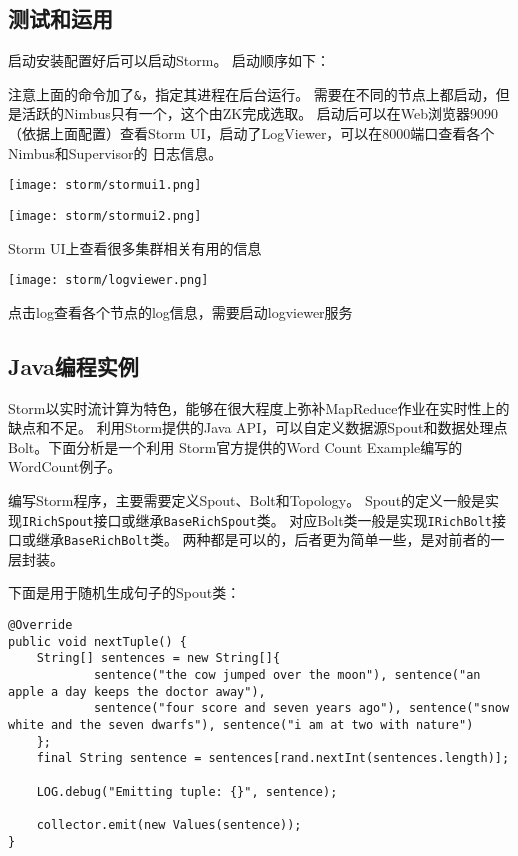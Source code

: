 \subsection{测试和运用}
启动安装配置好后可以启动Storm。
启动顺序如下：



注意上面的命令加了\lstinline{&}，指定其进程在后台运行。
需要在不同的节点上都启动，但是活跃的Nimbus只有一个，这个由ZK完成选取。
启动后可以在Web浏览器9090（依据上面配置）查看Storm UI，启动了LogViewer，可以在8000端口查看各个Nimbus和Supervisor的
日志信息。

\begin{center}
    \texttt{[image: storm/stormui1.png]}

    \texttt{[image: storm/stormui2.png]}

    Storm UI上查看很多集群相关有用的信息
\end{center}

\begin{center}
    \texttt{[image: storm/logviewer.png]}

    点击log查看各个节点的log信息，需要启动logviewer服务
\end{center}

\subsection{Java编程实例}

Storm以实时流计算为特色，能够在很大程度上弥补MapReduce作业在实时性上的缺点和不足。
利用Storm提供的Java API，可以自定义数据源Spout和数据处理点Bolt。下面分析是一个利用
Storm官方提供的Word Count Example编写的WordCount例子。

编写Storm程序，主要需要定义Spout、Bolt和Topology。
Spout的定义一般是实现\lstinline{IRichSpout}接口或继承\lstinline{BaseRichSpout}类。
对应Bolt类一般是实现\lstinline{IRichBolt}接口或继承\lstinline{BaseRichBolt}类。
两种都是可以的，后者更为简单一些，是对前者的一层封装。

下面是用于随机生成句子的Spout类：



\begin{lstlisting}[style=customjava]
@Override
public void nextTuple() {
	String[] sentences = new String[]{
			sentence("the cow jumped over the moon"), sentence("an apple a day keeps the doctor away"),
			sentence("four score and seven years ago"), sentence("snow white and the seven dwarfs"), sentence("i am at two with nature")
	};
	final String sentence = sentences[rand.nextInt(sentences.length)];

	LOG.debug("Emitting tuple: {}", sentence);

	collector.emit(new Values(sentence));
}	
\end{lstlisting}

